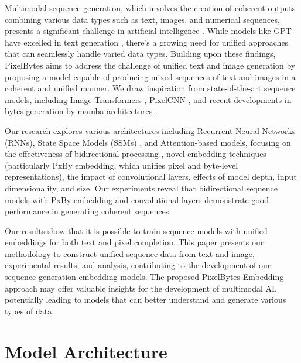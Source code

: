 \documentclass[10pt,a4paper]{article}
\begin{document}
Multimodal sequence generation, which involves the creation of coherent outputs combining various data types such as text, images, and numerical sequences, presents a significant challenge in artificial intelligence \cite{baltruvsaitis2018multimodal}. While models like GPT have excelled in text generation \cite{brown2020language}, there's a growing need for unified approaches that can seamlessly handle varied data types. Building upon these findings, PixelBytes aims to address the challenge of unified text and image generation by proposing a model capable of producing mixed sequences of text and images in a coherent and unified manner. We draw inspiration from state-of-the-art sequence models, including Image Transformers \cite{parmar2018image}, PixelCNN \cite{van2016conditional}, and recent developments in bytes generation by mamba architectures \cite{wang2024mambabyte}.

Our research explores various architectures including Recurrent Neural Networks (RNNs), State Space Models (SSMs) \cite{dao2024transformers}, and Attention-based models, focusing on the effectiveness of bidirectional processing \cite{zhu2024vision}, novel embedding techniques (particularly PxBy embedding, which unifies pixel and byte-level representations), the impact of convolutional layers, effects of model depth, input dimensionality, and size. Our experiments reveal that bidirectional sequence models with PxBy embedding and convolutional layers demonstrate good performance in generating coherent sequences.

Our results show that it is possible to train sequence models with unified embeddings for both text and pixel completion. This paper presents our methodology to construct unified sequence data from text and image, experimental results, and analysis, contributing to the development of our sequence generation embedding models. The proposed PixelBytes Embedding approach may offer valuable insights for the development of multimodal AI, potentially leading to models that can better understand and generate various types of data.

\section{Model Architecture}
\end{document}
